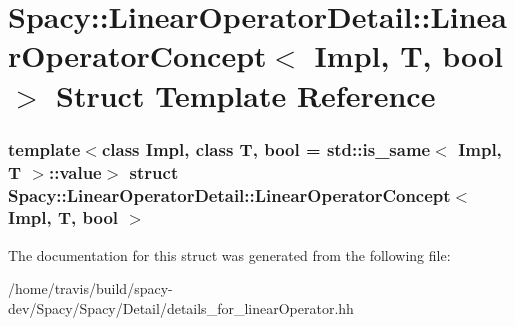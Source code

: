 \hypertarget{structSpacy_1_1LinearOperatorDetail_1_1LinearOperatorConcept}{\section{\-Spacy\-:\-:\-Linear\-Operator\-Detail\-:\-:\-Linear\-Operator\-Concept$<$ \-Impl, \-T, bool $>$ \-Struct \-Template \-Reference}
\label{structSpacy_1_1LinearOperatorDetail_1_1LinearOperatorConcept}
}
\subsubsection*{template$<$class Impl, class T, bool = std\-::is\-\_\-same$<$ Impl, T $>$\-::value$>$ struct Spacy\-::\-Linear\-Operator\-Detail\-::\-Linear\-Operator\-Concept$<$ Impl, T, bool $>$}



\-The documentation for this struct was generated from the following file\-:\begin{DoxyCompactItemize}
\item 
/home/travis/build/spacy-\/dev/\-Spacy/\-Spacy/\-Detail/details\-\_\-for\-\_\-linear\-Operator.\-hh\end{DoxyCompactItemize}
